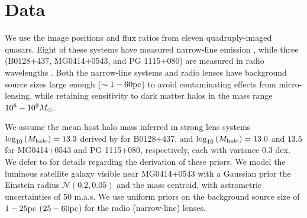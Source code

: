 \section{Data}
\label{sec:data}
We use the image positions and flux ratios from eleven quadruply-imaged quasars. Eight of these systems have measured narrow-line emission \citep{Nierenberg++14,Nierenberg++17,Nierenberg++19}, while three (B0128+437, MG0414+0543, and PG 1115+080) are measured in radio wavelengths \citep{Koopmans++03,Katz++97,Chiba++05}. Both the narrow-line systems and radio lenses have background source sizes large enough ($\sim 1-60 \rm{pc}$) to avoid contaminating effects from micro-lensing, while retaining sensitivity to dark matter halos in the mass range $10^{6}-10^{9} {M_{\odot}}$. 

We assume the mean host halo mass inferred in strong lens systems $\log_{10} \left(M_{\rm{halo}}\right) = 13.3$ derived by \citep{Lagattuta++10} for B0128+437, and $ \log_{10} \left(M_{\rm{halo}}\right) = 13.0$ and $13.5$ for MG0414+0543 and PG 1115+080, respectively, each with variance 0.3 dex. We defer to \citet{Gilman++19b} for details regarding the derivation of these priors. We model the luminous satellite galaxy visible near MG0414+0543 \citep{Ros++00} with a Gaussian prior the Einstein radius $\mathcal{N} \left(0.2, 0.05\right)$ and the mass centroid, with astrometric uncertainties of 50 m.a.s. We use uniform priors on the background source size of $1-25 \rm{pc}$ ($25-60 \rm{pc}$) for the radio (narrow-line) lenses. 

